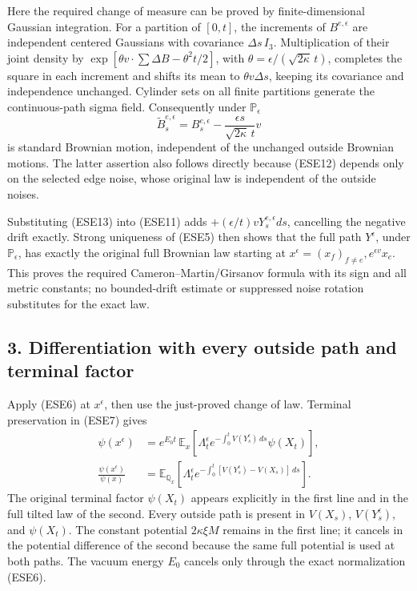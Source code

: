 \documentclass[11pt]{article}
\begin{document}
Here the required change of measure can be proved by finite-dimensional Gaussian integration. For a partition of \([0,t]\), the increments of \(B^{e,\epsilon}\) are independent centered Gaussians with covariance \(\Delta s\,I_3\). Multiplication of their joint density by
\(\exp[\theta v\cdot\sum\Delta B-\theta^2t/2]\), with
\(\theta=\epsilon/(\sqrt{2\kappa}\,t)\), completes the square in each increment and shifts its mean to \(\theta v\Delta s\), keeping its covariance and independence unchanged. Cylinder sets on all finite partitions generate the continuous-path sigma field. Consequently under \(\mathbb P_\epsilon\)
\[
 \widetilde B_s^{e,\epsilon}
       =B_s^{e,\epsilon}
                    -\frac{\epsilon s}{\sqrt{2\kappa}\,t}v
 \tag{ESE13}
\]
is standard Brownian motion, independent of the unchanged outside Brownian motions. The latter assertion also follows directly because (ESE12) depends only on the selected edge noise, whose original law is independent of the outside noises.

Substituting (ESE13) into (ESE11) adds
\(+(\epsilon/t)vY_s^{e,\epsilon}ds\), cancelling the negative drift exactly. Strong uniqueness of (ESE5) then shows that the full path \(Y^\epsilon\), under \(\mathbb P_\epsilon\), has exactly the original full Brownian law starting at
\(x^\epsilon=(x_f)_{f\ne e},e^{\epsilon v}x_e\).
This proves the required Cameron–Martin/Girsanov formula with its sign and all metric constants; no bounded-drift estimate or suppressed noise rotation substitutes for the exact law.

\subsection*{3. Differentiation with every outside path and terminal factor}

Apply (ESE6) at \(x^\epsilon\), then use the just-proved change of law. Terminal preservation in (ESE7) gives
\[
 \begin{aligned}
 \psi(x^\epsilon)
 &=e^{E_0t}\,
   \mathbb E_x\!\left[
     \Lambda_t^\epsilon
       e^{-\int_0^t V(Y_s^\epsilon)\,ds}\psi(X_t)\right],\\
 \frac{\psi(x^\epsilon)}{\psi(x)}
 &=\mathbb E_{\mathbb Q_x}\!\left[
     \Lambda_t^\epsilon
       e^{-\int_0^t[V(Y_s^\epsilon)-V(X_s)]\,ds}\right].
 \end{aligned}\tag{ESE14}
\]
The original terminal factor \(\psi(X_t)\) appears explicitly in the first line and in the full tilted law of the second. Every outside path is present in \(V(X_s)\), \(V(Y_s^\epsilon)\), and \(\psi(X_t)\). The constant potential \(2\kappa\xi M\) remains in the first line; it cancels in the potential difference of the second because the same full potential is used at both paths. The vacuum energy \(E_0\) cancels only through the exact normalization (ESE6).
\end{document}
